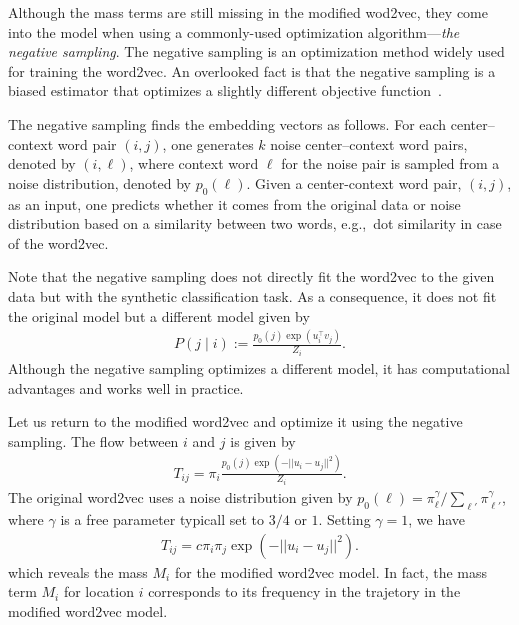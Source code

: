 \documentclass[12pt]{article} %
\def\given{\mid}
\def\eg{e.g.,~}
\begin{document}
Although the mass terms are still missing in the modified wod2vec, they come into the model when using a commonly-used optimization algorithm---\emph{the negative sampling}.
The negative sampling is an optimization method widely used for training the word2vec.
An overlooked fact is that the negative sampling is a biased estimator that optimizes a slightly different objective function~\cite{Gutmann2010}.

The negative sampling finds the embedding vectors as follows.
For each center--context word pair $(i,j)$, one generates $k$ noise center--context word pairs, denoted by $(i, \ell)$, where context word $\ell$ for the noise pair is sampled from a noise distribution, denoted by $p_{0}(\ell)$.
Given a center-context word pair, $(i,j)$, as an input, one predicts whether it comes from the original data or noise distribution based on
a similarity between two words, \eg dot similarity in case of the word2vec.

Note that the negative sampling does not directly fit the word2vec to the given data but with the synthetic classification task.
As a consequence, it does not fit the original model but a different model given by \cite{Gutmann2010}
\begin{align}
    P\left(j \given i \right):= \frac{p_0(j)\exp(u^\top _i v_j)}{Z_i}.
\end{align}
Although the negative sampling optimizes a different model, it has computational advantages and works well in practice.

Let us return to the modified word2vec and optimize it using the negative sampling.
The flow between $i$ and $j$ is given by
\begin{align}
    T_{ij}=\pi_i\frac{p_0(j)\exp(-||u_i - u_j||^2)}{Z_i}.
\end{align}
The original word2vec uses a noise distribution given by $p_{0}(\ell) = \pi^{\gamma} _\ell / \sum_{\ell'} \pi^{\gamma}_{\ell'}$, where $\gamma$ is a free parameter typicall set to $3/4$ or $1$.
Setting $\gamma=1$, we have
\begin{align}
    T_{ij}=c\pi_i \pi_j\exp(-||u_i - u_j||^2).
\end{align}
which reveals the mass $M_i$ for the modified word2vec model.
In fact, the mass term $M_i$ for location $i$ corresponds to its frequency in the trajetory in the modified word2vec model.

\printbibliography{}
\end{document}
